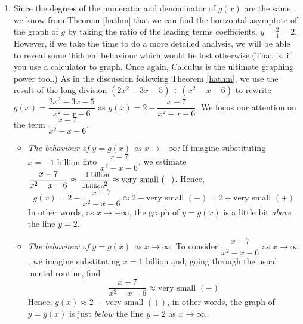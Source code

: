 {\begin{enumerate}
\begin{itemize}
\end{itemize}

Our results are given graphically (again, without labels on the $y$-axis) in Figure \ref{fig:ratgraph5}.




\item  Since the degrees of the numerator and denominator of $g(x)$ are the same, we know from Theorem \ref{hathm} that we can find the horizontal asymptote of the graph of $g$ by taking the ratio of the leading terms coefficients, $y = \frac{2}{1} = 2$.  However, if we take the time to do a more detailed analysis, we will be able to reveal some `hidden' behaviour which would be lost otherwise.(That is, if you use a calculator to graph. Once again, Calculus is the ultimate graphing power tool.)  As in the discussion following Theorem \ref{hathm}, we use the result of the long division $\left(2x^2-3x-5\right) \div \left(x^2-x-6\right)$ to rewrite $g(x) = \dfrac{2x^2-3x-5}{x^2-x-6}$ as $g(x) = 2 - \dfrac{x-7}{x^2-x-6}.$  We focus our attention on the term $\dfrac{x-7}{x^2-x-6}$.  

\begin{itemize}

\item  \textit{The behaviour of $y=g(x)$ as $x \rightarrow -\infty$:} If imagine substituting $x = \mbox{$-1$ billion}$ into $\dfrac{x-7}{x^2-x-6}$, we estimate $\dfrac{x-7}{x^2-x-6} \approx \dfrac{\mbox{\scriptsize $-1$ billion}}{1 \mbox{\scriptsize billion}^2} \approx \mbox{very small $(-)$}$.  Hence, \[g(x) =  2 - \dfrac{x-7}{x^2-x-6} \approx 2 - \mbox{very small $(-)$} = 2 + \mbox{very small $(+)$}\]  In other words, as $x \rightarrow -\infty$, the graph of $y=g(x)$ is a little bit \textit{above} the line $y=2$.


\item  \textit{The behaviour of $y=g(x)$ as $x \rightarrow \infty$.}  To consider $\dfrac{x-7}{x^2-x-6}$ as $x \rightarrow \infty$, we imagine substituting $x = \mbox{$1$ billion}$ and, going through the usual mental routine, find \[\dfrac{x-7}{x^2-x-6} \approx \mbox{very small $(+)$}\]  Hence, $g(x) \approx 2 - \ \mbox{very small $(+)$}$, in other words, the graph of $y=g(x)$ is just \textit{below} the line $y=2$ as $x \rightarrow \infty$.


\end{itemize}
\end{enumerate}}
